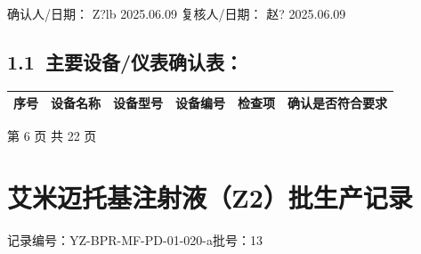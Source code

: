\documentclass[UTF8,10pt,a4paper,fontset=fandol]{ctexart}
\newcommand{\fieldvalue}[1]{#1}
\newcommand{\handwritten}[1]{#1}
\begin{document}
\vspace{0.5em}

确认人/日期：
\fieldvalue{\handwritten{Z?lb}}
\quad
\fieldvalue{\handwritten{2025.06.09}}
\hfill
复核人/日期：
\fieldvalue{\handwritten{赵?}}
\quad
\fieldvalue{\handwritten{2025.06.09}}

\subsection*{1.1\ 主要设备/仪表确认表：}

\begin{center}
\begin{tabularx}{\textwidth}{|c|X|X|X|X|X|}
\hline
序号 & 设备名称 & 设备型号 & 设备编号 & 检查项 & 确认是否符合要求\\
\hline
\end{tabularx}
\end{center}


\begin{center}
{\small 第 6 页 共 22 页}
\end{center}

\newpage

\section*{艾米迈托基注射液（Z2）批生产记录}

\noindent
记录编号：YZ-BPR-MF-PD-01-020-a\hfill 批号：13
\end{document}
